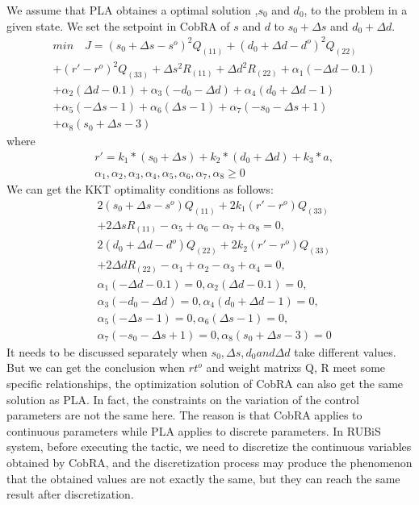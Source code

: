 \documentclass[sigconf]{acmart}
\begin{document}
We assume that PLA obtaines a optimal solution ,$s_0$ and $d_0$, to the problem in a given state. We set the setpoint in CobRA of $s$ and $d$ to $s_0+\Delta s$ and $d_0+\Delta d$. 
\begin{equation}
\begin{aligned}
&min\quad J=(s_0+\Delta s-s^o)^2 Q_(11)+(d_0+\Delta d-d^o)^2 Q_(22)\\
&+(r'-r^o)^2 Q_(33)+\Delta s^2 R_(11)+\Delta d^2 R_(22)+\alpha _1(-\Delta d-0.1)\\
&+\alpha _2(\Delta d-0.1)+\alpha _3(-d_0-\Delta d)+\alpha _4(d_0+\Delta d-1)\\
&+\alpha _5(-\Delta s-1)+\alpha _6(\Delta s-1)+\alpha _7(-s_0-\Delta s+1)\\&+\alpha _8(s_0+\Delta s-3)
\end{aligned}
\end{equation}
where
\begin{equation}
\begin{aligned}
&r'=k_1 *(s_0+\Delta s)+k_2 *(d_0+\Delta d)+k_3*a,\\
&\alpha _1,\alpha _2,\alpha _3,\alpha _4,\alpha _5,\alpha _6,\alpha _7,\alpha _8\geq 0
\end{aligned}
\end{equation}
We can get the KKT optimality conditions as follows:
\begin{equation}
\begin{aligned}
&2(s_0+\Delta s-s^o)Q_(11)+2k_1 (r'-r^o)Q_(33)\\
&+2\Delta s R_(11)-\alpha _5+\alpha _6-\alpha _7+\alpha _8=0,\\
&2(d_0+\Delta d-d^o) Q_(22)+2k_2 (r'-r^o)Q_(33)\\
&+2\Delta d R_(22)-\alpha _1+\alpha _2-\alpha _3+\alpha _4=0,\\
&\alpha _1(-\Delta d-0.1)=0,\alpha _2(\Delta d-0.1)=0,\\
&\alpha _3(-d_0-\Delta d)=0,\alpha _4(d_0+\Delta d-1)=0,\\
&\alpha _5(-\Delta s-1)=0,\alpha _6(\Delta s-1)=0,\\
&\alpha _7(-s_0-\Delta s+1)=0,\alpha _8(s_0+\Delta s-3)=0
\end{aligned}
\end{equation}
It needs to be discussed separately when $s_0, \Delta s, d_0 and \Delta d$ take different values. But we can get the conclusion when $rt^o$ and weight matrixs Q, R meet some specific relationships, the optimization solution of CobRA can also get the same solution as PLA.
In fact, the constraints on the variation of the control parameters are not the same here. The reason is that CobRA applies to continuous parameters while PLA applies to discrete parameters.
In RUBiS system, before executing the tactic, we need to discretize the continuous variables obtained by CobRA, and the discretization process may produce the phenomenon that the obtained values are not exactly the same, but they can reach the same result after discretization.
\end{document}
